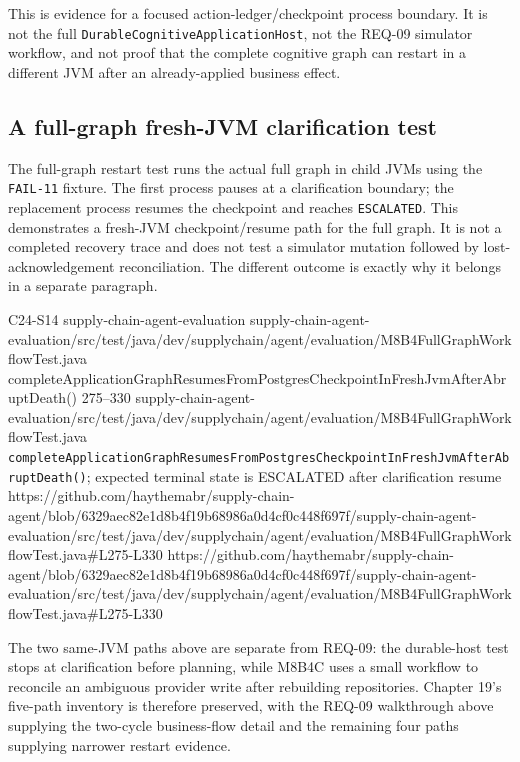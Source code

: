 This is evidence for a focused action-ledger/checkpoint process boundary. It is not the full \texttt{DurableCognitive\allowbreak{}ApplicationHost}, not the REQ-09 simulator workflow, and not proof that the complete cognitive graph can restart in a different JVM after an already-applied business effect.

\subsection{A full-graph fresh-JVM clarification test}

The full-graph restart test runs the actual full graph in child JVMs using the \texttt{FAIL-11} fixture. The first process pauses at a clarification boundary; the replacement process resumes the checkpoint and reaches \texttt{ESCALATED}. This demonstrates a fresh-JVM checkpoint/resume path for the full graph. It is not a completed recovery trace and does not test a simulator mutation followed by lost-acknowledgement reconciliation. The different outcome is exactly why it belongs in a separate paragraph.

\BookSourceReferenceNoQR
  {C24-S14}
  {supply-chain-agent-evaluation}
  {supply-chain-agent-evaluation/src/test/java/dev/supplychain/agent/evaluation/M8B4FullGraphWorkflowTest.java}
  {completeApplicationGraphResumesFromPostgresCheckpointInFreshJvmAfterAbruptDeath()}
  {275--330}
  {supply-chain-agent-evaluation/src/test/java/dev/supplychain/agent/evaluation/M8B4FullGraphWorkflowTest.java}
  {\texttt{completeApplicationGraphResumesFromPostgresCheckpointInFreshJvmAfterAbruptDeath()}; expected terminal state is ESCALATED after clarification resume}
  {https://github.com/haythemabr/supply-chain-agent/blob/6329aec82e1d8b4f19b68986a0d4cf0c448f697f/supply-chain-agent-evaluation/src/test/java/dev/supplychain/agent/evaluation/M8B4FullGraphWorkflowTest.java\#L275-L330}
  {https://github.com/haythemabr/supply-chain-agent/blob/6329aec82e1d8b4f19b68986a0d4cf0c448f697f/supply-chain-agent-evaluation/src/test/java/dev/supplychain/agent/evaluation/M8B4FullGraphWorkflowTest.java\#L275-L330}

The two same-JVM paths above are separate from REQ-09: the durable-host test stops at clarification before planning, while M8B4C uses a small workflow to reconcile an ambiguous provider write after rebuilding repositories. Chapter 19's five-path inventory is therefore preserved, with the REQ-09 walkthrough above supplying the two-cycle business-flow detail and the remaining four paths supplying narrower restart evidence.

